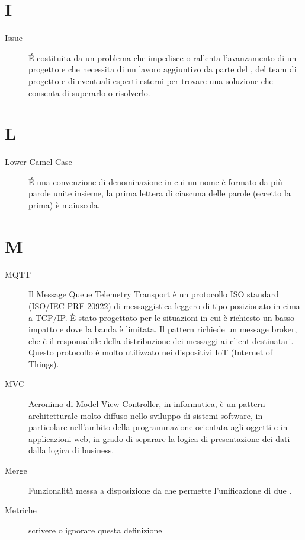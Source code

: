 \documentclass[a4paper, oneside]{article}
\begin{document}
\section{I}
\begin{description}
  \item[Issue] É costituita da un problema che impedisce o rallenta l'avanzamento di un progetto e che necessita di un lavoro aggiuntivo da parte del \RdP{}, del team di progetto e di eventuali esperti esterni per trovare una soluzione che consenta di superarlo o risolverlo.
\end{description}
\newpage
\section{L}
\begin{description}
  \item[Lower Camel Case] É una convenzione di denominazione in cui un nome è formato da più parole unite insieme, la prima lettera di ciascuna delle parole (eccetto la prima) è maiuscola.
\end{description}
\newpage
\section{M}
\begin{description}
  \item[MQTT] Il Message Queue Telemetry Transport è un protocollo ISO standard (ISO/IEC PRF 20922) di messaggistica leggero di tipo  posizionato in cima a TCP/IP. È stato progettato per le situazioni in cui è richiesto un basso impatto e dove la banda è limitata. Il pattern  richiede un message broker, che è il responsabile della distribuzione dei messaggi ai client destinatari. Questo protocollo è molto utilizzato nei dispositivi IoT (Internet of Things).
  \item[MVC] Acronimo di Model View Controller, in informatica, è un pattern architetturale molto diffuso nello sviluppo di sistemi software, in particolare nell'ambito della programmazione orientata agli oggetti e in applicazioni web, in grado di separare la logica di presentazione dei dati dalla logica di business.
  \item[Merge] Funzionalità messa a disposizione da  che permette l'unificazione di due .
  \item[Metriche] {scrivere o ignorare questa definizione}
\end{description}
\newpage
\end{document}
